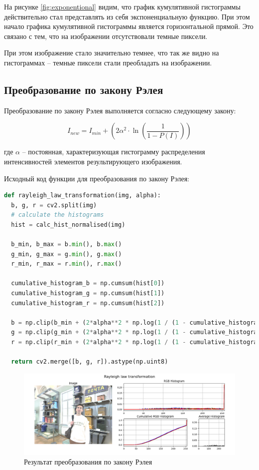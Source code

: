 На рисунке \ref{fig:exponentional} видим, что график кумулятивной гистограммы действительно стал представлять из себя экспоненциальную функцию. 
При этом начало графика кумулятивной гистограммы является горизонтальной прямой. Это связано с тем, что на изображении отсутствовали темные пиксели. 

При этом изображение стало значительно темнее, что так же видно на гистограммах -- темные пиксели стали преобладать на изображении.


\subsection{Преобразование по закону Рэлея}  

Преобразование по закону Рэлея выполняется согласно следующему закону:

\begin{equation}
  I_{new} = I_{min} + \left(2\alpha^2 \cdot \ln\left(\frac{1}{1 - P(I)}\right)\right)
\end{equation}

где $\alpha$ -- постоянная, характеризующая гистограмму распределения интенсивностей элементов результирующего изображения. 

Исходный код функции для преобразования по закону Рэлея:

\begin{lstlisting}[language=Python]
def rayleigh_law_transformation(img, alpha):
  b, g, r = cv2.split(img)
  # calculate the histograms
  hist = calc_hist_normalised(img)

  b_min, b_max = b.min(), b.max()
  g_min, g_max = g.min(), g.max()
  r_min, r_max = r.min(), r.max()

  cumulative_histogram_b = np.cumsum(hist[0]) 
  cumulative_histogram_g = np.cumsum(hist[1])
  cumulative_histogram_r = np.cumsum(hist[2])

  b = np.clip(b_min + (2*alpha**2 * np.log(1 / (1 - cumulative_histogram_b[b]))) ** 0.5 * 255, 0, 255)
  g = np.clip(g_min + (2*alpha**2 * np.log(1 / (1 - cumulative_histogram_g[g]))) ** 0.5 * 255, 0, 255)
  r = np.clip(r_min + (2*alpha**2 * np.log(1 / (1 - cumulative_histogram_r[r]))) ** 0.5 * 255, 0, 255)
  
  return cv2.merge([b, g, r]).astype(np.uint8)
\end{lstlisting}

\begin{figure}[H]
    \centering
    \includegraphics[width=\textwidth]{../results/Rayleigh law transformation.png}
    \caption{Результат преобразования по закону Рэлея}
    \label{fig:rayleigh}
\end{figure}

